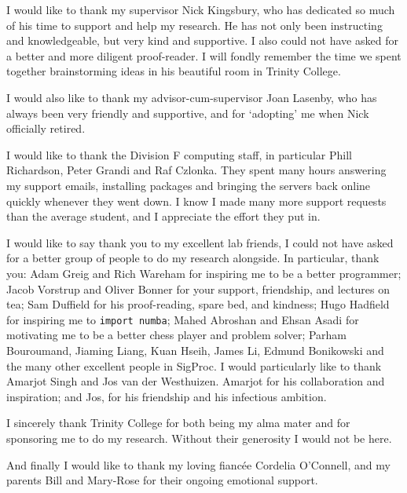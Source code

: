 
\begin{acknowledgements}

  I would like to thank my supervisor Nick Kingsbury, who has dedicated so
  much of his time to support and help my research. He has not only been instructing and
  knowledgeable, but very kind and supportive. I also could not have asked for a
  better and more diligent proof-reader. I will fondly remember the time
  we spent together brainstorming ideas in his beautiful room in Trinity
  College.
  
  I would also like to thank my advisor-cum-supervisor Joan Lasenby, who has always
  been very friendly and supportive, and for `adopting' me when Nick officially
  retired.

  I would like to thank the Division F computing staff, in particular Phill
  Richardson, Peter Grandi and Raf Czlonka. They spent many hours answering my
  support emails, installing packages and bringing
  the servers back online quickly whenever they went down. I know I made many
  more support requests than the average student, and I appreciate the effort
  they put in.

  I would like to say thank you to my excellent lab friends, I could not have asked for a better group of
  people to do my research alongside. In particular, thank you: Adam Greig and Rich Wareham
  for inspiring me to be a better programmer; Jacob Vorstrup and Oliver Bonner 
  for your support, friendship, and lectures on tea; Sam Duffield for his
  proof-reading, spare bed, and kindness; Hugo Hadfield for
  inspiring me to \texttt{import numba}; Mahed Abroshan and Ehsan Asadi for
  motivating me to be a better chess player and problem solver; Parham Bouroumand, 
  Jiaming Liang, Kuan Hseih, James Li, Edmund Bonikowski and the many other
  excellent people in SigProc. I would particularly like to thank Amarjot Singh
  and Jos van der Westhuizen. Amarjot for his collaboration and inspiration; and Jos, 
  for his friendship and his infectious ambition.
  
  I sincerely thank Trinity College for both being my alma mater and
  for sponsoring me to do my research. Without their generosity I would not be
  here.

  And finally I would like to thank my loving fianc\'ee Cordelia O'Connell, and my parents
  Bill and Mary-Rose for their ongoing emotional support.
\end{acknowledgements}
